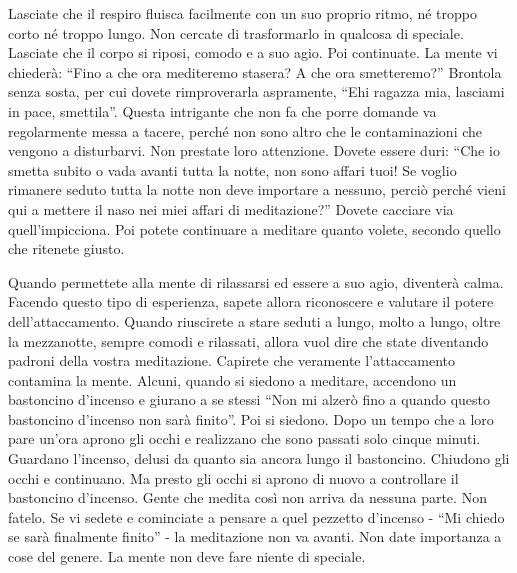 Lasciate che il respiro fluisca facilmente con un suo proprio ritmo, né
troppo corto né troppo lungo. Non cercate di trasformarlo in qualcosa di
speciale. Lasciate che il corpo si riposi, comodo e a suo agio. Poi
continuate. La mente vi chiederà: ``Fino a che ora mediteremo stasera? A
che ora smetteremo?'' Brontola senza sosta, per cui dovete rimproverarla
aspramente, ``Ehi ragazza mia, lasciami in pace, smettila''. Questa
intrigante che non fa che porre domande va regolarmente messa a tacere,
perché non sono altro che le contaminazioni che vengono a disturbarvi.
Non prestate loro attenzione. Dovete essere duri: ``Che io smetta subito
o vada avanti tutta la notte, non sono affari tuoi! Se voglio rimanere
seduto tutta la notte non deve importare a nessuno, perciò perché vieni
qui a mettere il naso nei miei affari di meditazione?'' Dovete cacciare
via quell'impicciona. Poi potete continuare a meditare quanto volete,
secondo quello che ritenete giusto.

Quando permettete alla mente di rilassarsi ed essere a suo agio,
diventerà calma. Facendo questo tipo di esperienza, sapete allora
riconoscere e valutare il potere dell'attaccamento. Quando riuscirete a
stare seduti a lungo, molto a lungo, oltre la mezzanotte, sempre comodi
e rilassati, allora vuol dire che state diventando padroni della vostra
meditazione. Capirete che veramente l'attaccamento contamina la mente.
Alcuni, quando si siedono a meditare, accendono un bastoncino d'incenso
e giurano a se stessi ``Non mi alzerò fino a quando questo bastoncino
d'incenso non sarà finito''. Poi si siedono. Dopo un tempo che a loro
pare un'ora aprono gli occhi e realizzano che sono passati solo cinque
minuti. Guardano l'incenso, delusi da quanto sia ancora lungo il
bastoncino. Chiudono gli occhi e continuano. Ma presto gli occhi si
aprono di nuovo a controllare il bastoncino d'incenso. Gente che medita
così non arriva da nessuna parte. Non fatelo. Se vi sedete e cominciate
a pensare a quel pezzetto d'incenso - ``Mi chiedo se sarà finalmente
finito'' - la meditazione non va avanti. Non date importanza a cose del
genere. La mente non deve fare niente di speciale.

